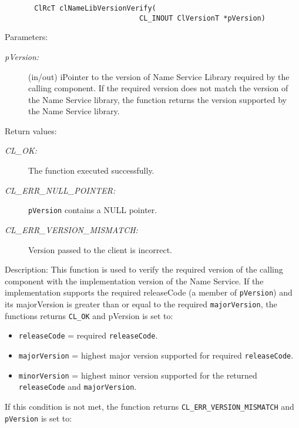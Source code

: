 \begin{flushleft}
\begin{Desc}
\footnotesize\begin{verbatim}       ClRcT clNameLibVersionVerify(
                           		CL_INOUT ClVersionT *pVersion)
\end{verbatim}
\normalsize
\end{Desc}
\begin{Desc}
\item[Parameters:]
\begin{description}
\item[{\em p\-Version:}](in/out) iPointer to the version of Name Service Library required by the calling component. If the required version does not match the
version of the Name Service library, the function returns the version supported by the Name Service library. \end{description}
\end{Desc}
\begin{Desc}
\item[Return values:]
\begin{description}
\item[{\em CL\_\-OK:}]The function executed successfully. 
\item[{\em CL\_\-ERR\_\-NULL\_\-POINTER:}]{\tt{pVersion}} contains a NULL pointer.
\item[{\em CL\_\-ERR\_\-VERSION\_\-MISMATCH:}]Version passed to the client is incorrect.
\end{description}
\end{Desc}
\begin{Desc}
\item[Description:]This function is used to verify the required version of the calling component with the implementation version of the Name Service. 
If the implementation supports the required releaseCode (a member of {\tt{pVersion}}) and its majorVersion is greater than or equal to the required 
{\tt{majorVersion}}, the functions returns {\tt{CL\_\-OK}} and pVersion is set to:
\begin{itemize}
\item
{\tt{releaseCode}} = required {\tt{releaseCode}}.
\item
{\tt{majorVersion}} = highest major version supported for required {\tt{releaseCode}}.
\item
{\tt{minorVersion}} = highest minor version supported for the returned {\tt{releaseCode}} and {\tt{majorVersion}}.
\end{itemize}
If this condition is not met, the function returns {\tt{CL\_\-ERR\_\-VERSION\_\-MISMATCH}} and {\tt{pVersion}} is set to:

\end{Desc}
\end{flushleft}
